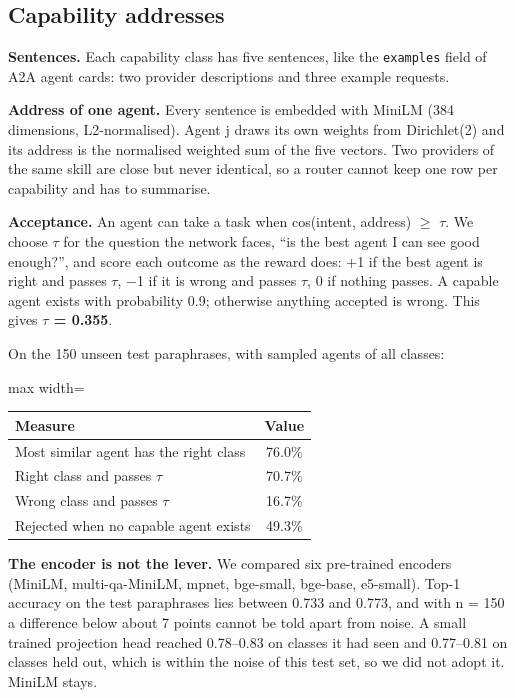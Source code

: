 \documentclass[journal]{IEEEtran}
\begin{document}
\subsection{Capability addresses}
\textbf{Sentences.} Each capability class has five sentences, like the \texttt{examples} field of A2A agent cards: two provider descriptions and three example requests.

\textbf{Address of one agent.} Every sentence is embedded with MiniLM (384 dimensions, L2-normalised). Agent j draws its own weights from Dirichlet(2) and its address is the normalised weighted sum of the five vectors. Two providers of the same skill are close but never identical, so a router cannot keep one row per capability and has to summarise.

\textbf{Acceptance.} An agent can take a task when cos(intent, address) $\geq$ $\tau$. We choose $\tau$ for the question the network faces, ``is the best agent I can see good enough?'', and score each outcome as the reward does: +1 if the best agent is right and passes $\tau$, $-$1 if it is wrong and passes $\tau$, 0 if nothing passes. A capable agent exists with probability 0.9; otherwise anything accepted is wrong. This gives \textbf{$\tau$ = 0.355}.

On the 150 unseen test paraphrases, with sampled agents of all classes:

\begin{center}
\footnotesize
\begin{adjustbox}{max width=\columnwidth}
\begin{tabular}{lc}
\toprule
Measure & Value \\
\midrule
Most similar agent has the right class & 76.0\% \\
Right class and passes $\tau$ & 70.7\% \\
Wrong class and passes $\tau$ & 16.7\% \\
Rejected when no capable agent exists & 49.3\% \\
\bottomrule
\end{tabular}
\end{adjustbox}
\end{center}

\textbf{The encoder is not the lever.} We compared six pre-trained encoders (MiniLM, multi-qa-MiniLM, mpnet, bge-small, bge-base, e5-small). Top-1 accuracy on the test paraphrases lies between 0.733 and 0.773, and with n = 150 a difference below about 7 points cannot be told apart from noise. A small trained projection head reached 0.78--0.83 on classes it had seen and 0.77--0.81 on classes held out, which is within the noise of this test set, so we did not adopt it. MiniLM stays.
\end{document}
